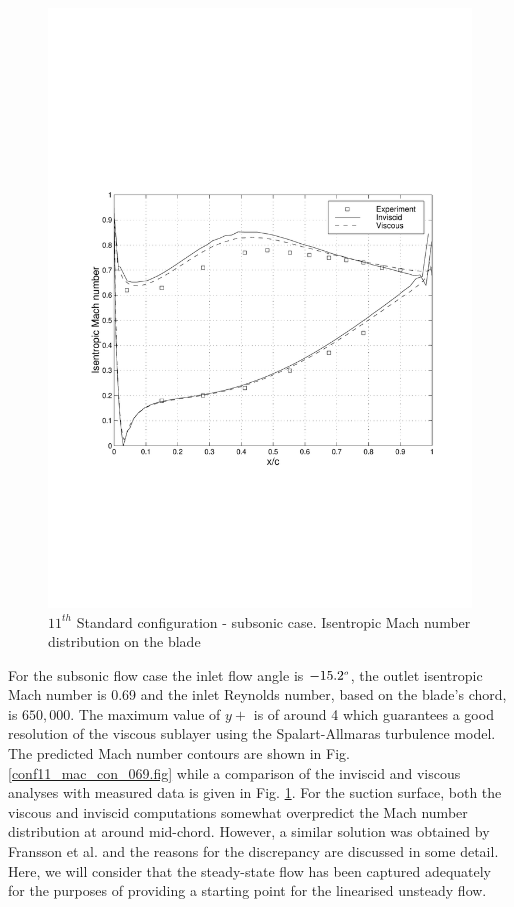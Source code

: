 \begin{figure}[ht]
 \centerline{\includegraphics[width=130mm,clip=t]{CHAP_LINEAR/FIGURE/steady_11th_m069_mac_bla.pdf}}
 \caption{$11^{th}$ Standard configuration - subsonic case.
           Isentropic Mach number distribution on the blade}
 \label{conf11_mac_bla_069.fig}
\end{figure}
%
 For the subsonic flow case the inlet flow angle is $-15.2^{\mbox{\tiny $o$}}$,
 the outlet isentropic Mach number is 0.69
 and the inlet Reynolds number, based on the blade's chord, is $650,000$.
 The maximum value of $y+$ is of around 4 which guarantees a good resolution of the
 viscous sublayer using the Spalart-Allmaras turbulence model.
 The predicted Mach number contours are shown in Fig. \ref{conf11_mac_con_069.fig}
 while a comparison of the inviscid and viscous analyses with measured data is given in
 Fig. \ref{conf11_mac_bla_069.fig}.
 For the suction surface, both the viscous and inviscid computations somewhat
 overpredict the Mach number distribution at around mid-chord. However, a similar
 solution was obtained by  Fransson et al. \citeyear{Bolcs:2} and the reasons for
 the discrepancy are discussed in some detail. Here, we will consider that the
 steady-state flow has been captured adequately for the purposes of providing a
 starting point for the linearised unsteady flow.

